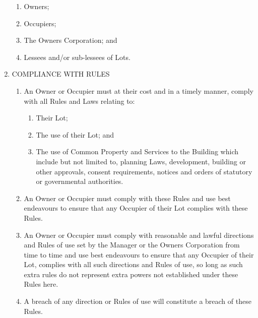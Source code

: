 \documentclass{article}
\begin{document}
\begin{enumerate}[label=\arabic*.]
\begin{enumerate}[label=(\arabic*)]

\item  Owners;

\item  Occupiers;

\item  The Owners Corporation; and

\item  Lessees and/or sub-lessees of Lots.

\end{enumerate}

\item  COMPLIANCE WITH RULES

\begin{enumerate}[label=\arabic{enumi}.\arabic*.]

\item  An Owner or Occupier must at their cost and in a timely manner, comply with all Rules and Laws relating to:

\begin{enumerate}[label=(\arabic*)]

\item  Their Lot;

\item  The use of their Lot; and

\item  The use of Common Property and Services to the Building which include but not limited to, planning Laws, development, building or other approvals, consent requirements, notices and orders of statutory or governmental authorities.

\end{enumerate}

\item  An Owner or Occupier must comply with these Rules and use best endeavours to ensure that any Occupier of their Lot complies with these Rules.

\item  An Owner or Occupier must comply with reasonable and lawful directions and Rules of use set by the Manager or the Owners Corporation from time to time and use best endeavours to ensure that any Occupier of their Lot, complies with all such directions and Rules of use, so long as such extra rules do not represent extra powers not established under these Rules here.
\newpage



\item  A breach of any direction or Rules of use will constitute a breach of these Rules.


\end{enumerate}
\end{enumerate}
\end{document}
